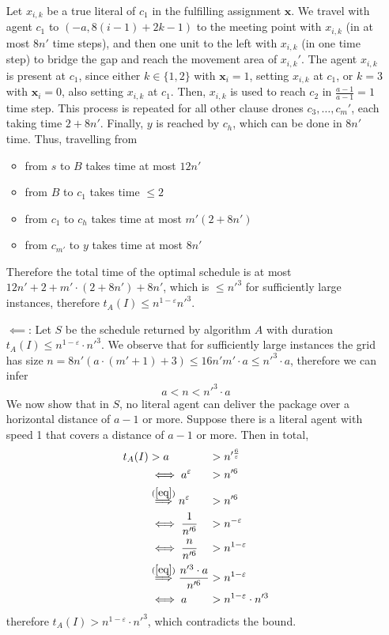 \begin{enumerate}
Let $x_{i,k}$ be a true literal of $c_1$ in the fulfilling assignment $\mathbf{x}$. We travel with agent $c_1$ to $(-a, 8(i-1) + 2k - 1)$ to the meeting point with $x_{i,k}$ (in at most $8n'$ time steps), and then one unit to the left with $x_{i,k}$ (in one time step) to bridge the gap and reach the movement area of $x_{i,k}'$. The agent $x_{i,k}$ is present at $c_1$, since either $k \in \{1, 2\}$ with $\mathbf{x}_i = 1$, setting $x_{i,k}$ at $c_1$, or $k = 3$ with $\mathbf{x}_i = 0$, also setting $x_{i,k}$ at $c_1$. Then, $x_{i,k}$ is used to reach $c_2$ in $\frac{a-1}{a-1}=1$ time step. This process is repeated for all other clause drones $c_3, \dots, c_m'$, each taking time $2+8n'$. Finally, $y$ is reached by $c_h$, which can be done in $8n'$ time. 
Thus, travelling from
\begin{itemize}
    \item from $s$ to $B$ takes time at most $12n'$
    \item from $B$ to $c_1$ takes time $\leq 2$
    \item from $c_1$ to $c_h$ takes time at most $m' (2+8n')$
    \item from $c_{m'}$ to $y$ takes time at most $8n'$
\end{itemize}
Therefore the total time of the optimal schedule is at most $12n'+2+m'\cdot(2+8n')+8n'$, which is $\leq n'^3$ for sufficiently large instances, therefore $t_A(I) \leq n^{1-\varepsilon}n'^3$.

\item[$\impliedby$:] 
Let $S$ be the schedule returned by algorithm $A$ with duration $t_A(I) \leq n^{1-\varepsilon}\cdot n'^3$. We observe that for sufficiently large instances the grid has size $n=8n'(a\cdot(m'+1)+3) \leq 16n'm'\cdot a \leq n'^3\cdot a$, therefore we can infer
\begin{equation}\label{eq}
    a < n < n'^3\cdot a
\end{equation}
We now show that in $S$, no literal agent can deliver the package over a horizontal distance of $a-1$ or more. 
Suppose there is a literal agent with speed 1 that covers a distance of $a-1$ or more. Then in total, 
$$
\begin{alignedat}{3}
    t_A(I)& > a  && > n'^{\frac{6}{\varepsilon}} \\
    &\iff  a^{\varepsilon} &&> n'^6 \\
    &\stackrel{\mathclap{(\ref{eq})}}{\implies} n^{\varepsilon} &&> n'^6 \\
    &\iff  \frac{1}{n'^6} &&> n^{-\varepsilon} \\
    &\iff  \frac{n}{n'^6} &&> n^{1-\varepsilon} \\
    &\stackrel{\mathclap{(\ref{eq})}}{\implies}  \frac{n'^3 \cdot a}{n'^6} &&> n^{1-\varepsilon} \\
    &\iff  a &&> n^{1-\varepsilon}\cdot n'^3 
\end{alignedat}
$$
therefore $t_A(I) > n^{1-\varepsilon}\cdot n'^3$, which contradicts the bound.


\end{enumerate}
